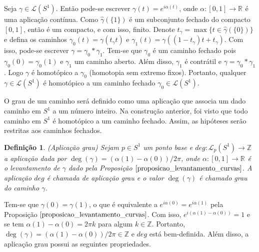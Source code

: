 \documentclass[12pt]{book}
\newtheorem{definicao}[teorema]{Definição}
\newcommand{\caminhos}{\mathcal{L}}
\newcommand{\caminhossempontobase}[1]{\caminhos(#1)}
\newcommand{\caminhospontobasegeral}[2]{\caminhos_{#1}(#2)}
\newcommand{\circulo}{S^{1}}
\newcommand{\inteiros}{\mathbb{Z}}
\newcommand{\intervalo}{[0,1]}
\newcommand{\real}[1]{\mathbb{R}^{#1}}
\newcommand{\reta}{\real{}}
\begin{document}
	Seja $\gamma \in \caminhossempontobase{\circulo}$. Então pode-se escrever $\gamma(t) = e^{i\alpha(t)}$, onde $\alpha:\intervalo \to \reta$ é uma aplicação contínua. Como $\hat{\gamma} (\{1\})$ é um subconjunto fechado do compacto $\intervalo$, então é um compacto, e com isso, finito. Denote $t_{\gamma} = \max\{t \in \hat{\gamma} (\{0\})\}$ e defina os caminhos $\gamma_{0}(t) = \gamma(t_{\gamma}t)$ e $\gamma_{1}(t) = \gamma((1-t_{\gamma})t+t_{\gamma})$. Com isso, pode-se escrever $\gamma = \gamma_{0}*\gamma_{1}$. Tem-se que $\gamma_{0}$ é um caminho fechado pois $\gamma_{0}(0) = \gamma_{0}(1)$ e $\gamma_{1}$ um caminho aberto. Além disso, $\gamma_{1}$ é contrátil e $\gamma = \gamma_{0}*\gamma_{1}$. Logo $\gamma$ é homotópico a $\gamma_{0}$ (homotopia sem extremo fixos). Portanto, qualquer $\gamma \in \caminhos(\circulo)$ é homotópico a um caminho fechado $\gamma_{0} \in \caminhos(\circulo)$.
	
	O grau de um caminho será definido como uma aplicação que associa um dado caminho em $\circulo$ a um número inteiro. Na construção anterior, foi visto que todo caminho em $\circulo$ é homotópico a um caminho fechado. Assim, as hipóteses serão restritas aos caminhos fechados.

	\begin{definicao}\label{definicao_aplicacao_grau}
		(Aplicação grau) Sejam $p \in \circulo$ um ponto base e $deg: \caminhospontobasegeral{p}{\circulo} \to \inteiros$ a aplicação dada por $\deg(\gamma) = (\alpha(1)-\alpha(0))/2\pi$, onde $\alpha:[0,1] \to \real{}$ é o levantamento de $\gamma$ dado pela Proposição $\ref{proposicao_levantamento_curvas}$. A aplicação $deg$ é chamada de aplicação grau e o valor $\deg(\gamma)$ é chamado grau do caminho $\gamma$.
	\end{definicao}
	
	Tem-se que $\gamma(0) = \gamma(1)$, o que é equivalente a $e^{i\alpha(0)} = e^{i\alpha(1)}$ pela Proposição $\ref{proposicao_levantamento_curvas}$. Com isso, $e^{i(\alpha(1)-\alpha(0))} = 1$ e se tem  $\alpha(1)-\alpha(0) = 2\pi k$ para algum $k \in \inteiros$. Portanto, $\deg(\gamma) = (\alpha(1)-\alpha(0))/2\pi \in \inteiros$ e $deg$ está bem-definida. Além disso, a aplicação grau possui as seguintes propriedades.
	
\end{document}
